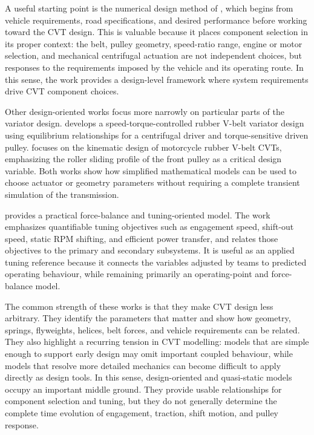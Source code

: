 \documentclass[11pt]{report}
\numberwithin{equation}{section}
\begin{document}
A useful starting point is the numerical design method of \citet{ArangoMunoz2020}, which begins from vehicle requirements, road specifications, and desired performance before working toward the CVT design. This is valuable because it places component selection in its proper context: the belt, pulley geometry, speed-ratio range, engine or motor selection, and mechanical centrifugal actuation are not independent choices, but responses to the requirements imposed by the vehicle and its operating route. In this sense, the work provides a design-level framework where system requirements drive CVT component choices.

Other design-oriented works focus more narrowly on particular parts of the variator design. \citet{Cammalleri2005} develops a speed-torque-controlled rubber V-belt variator design using equilibrium relationships for a centrifugal driver and torque-sensitive driven pulley. \citet{LaBattaglia2022} focuses on the kinematic design of motorcycle rubber V-belt CVTs, emphasizing the roller sliding profile of the front pulley as a critical design variable. Both works show how simplified mathematical models can be used to choose actuator or geometry parameters without requiring a complete transient simulation of the transmission.

\citet{Skinner2020} provides a practical force-balance and tuning-oriented model. The work emphasizes quantifiable tuning objectives such as engagement speed, shift-out speed, static RPM shifting, and efficient power transfer, and relates those objectives to the primary and secondary subsystems. It is useful as an applied tuning reference because it connects the variables adjusted by teams to predicted operating behaviour, while remaining primarily an operating-point and force-balance model.

The common strength of these works is that they make CVT design less arbitrary. They identify the parameters that matter and show how geometry, springs, flyweights, helices, belt forces, and vehicle requirements can be related. They also highlight a recurring tension in CVT modelling: models that are simple enough to support early design may omit important coupled behaviour, while models that resolve more detailed mechanics can become difficult to apply directly as design tools. In this sense, design-oriented and quasi-static models occupy an important middle ground. They provide usable relationships for component selection and tuning, but they do not generally determine the complete time evolution of engagement, traction, shift motion, and pulley response.
\end{document}

